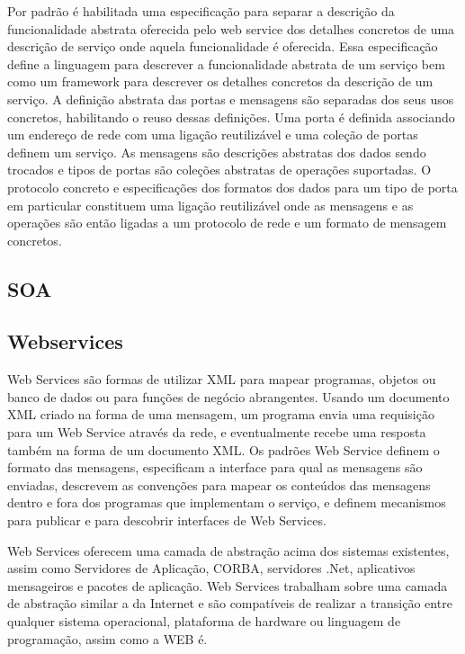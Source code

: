 \documentclass{acm_proc_article-sp}
\begin{document}
		Por padrão é habilitada uma especificação para separar a descrição da funcionalidade abstrata oferecida pelo web service dos detalhes concretos de uma descrição de serviço onde aquela funcionalidade é oferecida. Essa especificação define a linguagem para descrever a funcionalidade abstrata de um serviço bem como um framework para descrever os detalhes concretos da descrição de um serviço. A definição abstrata das portas e mensagens são separadas dos seus usos concretos, habilitando o reuso dessas definições. Uma porta é definida associando um endereço de rede com uma ligação reutilizável e uma coleção de portas definem um serviço. As mensagens são descrições abstratas dos dados sendo trocados e tipos de portas são coleções abstratas de operações suportadas. O protocolo concreto e especificações dos formatos dos dados para um tipo de porta em particular constituem uma ligação reutilizável onde as mensagens e as operações são então ligadas a um protocolo de rede e um formato de mensagem concretos. \cite{APACHE-AXIS}
		
		
	\subsection{SOA}
	
		
	\subsection{Webservices}
		
		Web Services são formas de utilizar XML para mapear programas, objetos ou banco de dados ou para funções de negócio abrangentes. Usando um documento XML criado na forma de uma mensagem, um programa envia uma requisição para um Web Service através da rede, e eventualmente recebe uma resposta também na forma de um documento XML. Os padrões Web Service definem o formato das mensagens, especificam a interface para qual as mensagens são enviadas, descrevem as convenções para mapear os conteúdos das mensagens dentro e fora dos programas que implementam o serviço, e definem mecanismos para publicar e para descobrir interfaces de Web Services.
		
		Web Services oferecem uma camada de abstração acima dos sistemas existentes, assim como Servidores de Aplicação, CORBA, servidores .Net, aplicativos mensageiros e pacotes de aplicação. Web Services trabalham sobre 
		uma camada de abstração similar a da Internet e são compatíveis de realizar a transição entre qualquer sistema operacional, plataforma de hardware ou linguagem de programação, assim como a WEB é.
		
\end{document}
